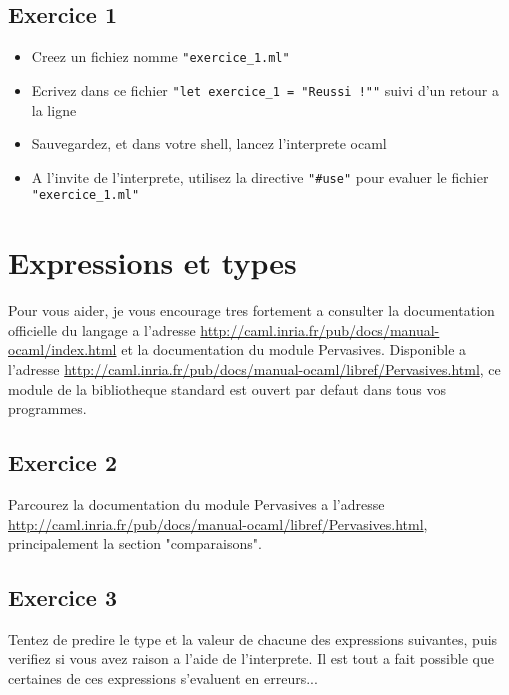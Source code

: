 \documentclass{life-fr}
\begin{document}
  \section{Exercice 1}

  \begin{itemize}
    \item Creez un fichiez nomme \texttt{"exercice\_1.ml"}
    \item Ecrivez dans ce fichier \texttt{"let exercice\_1 = "Reussi !""} suivi
      d'un retour a la ligne
    \item Sauvegardez, et dans votre shell, lancez l'interprete ocaml
    \item A l'invite de l'interprete, utilisez la directive \texttt{"\#use"}
      pour evaluer le fichier \texttt{"exercice\_1.ml"}
  \end{itemize}

\chapter{Expressions et types}

    Pour vous aider, je vous encourage tres fortement a consulter la
  documentation officielle du langage a l'adresse
  \url{http://caml.inria.fr/pub/docs/manual-ocaml/index.html} et la
  documentation du module Pervasives. Disponible a l'adresse
  \url{http://caml.inria.fr/pub/docs/manual-ocaml/libref/Pervasives.html}, ce
  module de la bibliotheque standard est ouvert par defaut dans tous vos
  programmes.


  \section{Exercice 2}

    Parcourez la documentation du module Pervasives a l'adresse
  \url{http://caml.inria.fr/pub/docs/manual-ocaml/libref/Pervasives.html},
  principalement la section "comparaisons".

  \section{Exercice 3}

    Tentez de predire le type et la valeur de chacune des expressions suivantes,
  puis verifiez si vous avez raison a l'aide de l'interprete. Il est tout a fait
  possible que certaines de ces expressions s'evaluent en erreurs...
\end{document}
